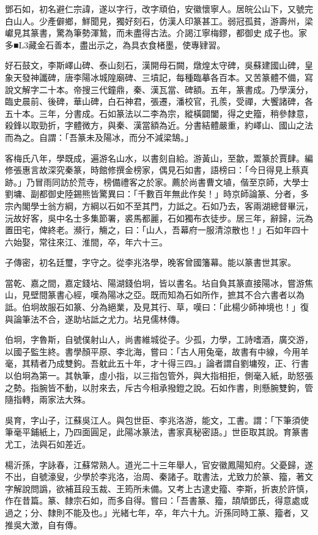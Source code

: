 \begin{pinyinscope}
鄧石如，初名避仁宗諱，遂以字行，改字頑伯，安徽懷寧人。居皖公山下，又號完白山人。少產僻鄉，鮮聞見，獨好刻石，仿漢人印篆甚工。弱冠孤貧，游壽州，梁巘見其篆書，驚為筆勢渾鷙，而未盡得古法。介謁江寧梅鏐，都御史成子也。家多■L3藏金石善本，盡出示之，為具衣食楮墨，使專肄習。

好石鼓文，李斯嶧山碑、泰山刻石，漢開母石闕，燉煌太守碑，吳蘇建國山碑，皇象天發神讖碑，唐李陽冰城隍廟碑、三墳記，每種臨摹各百本。又苦篆體不備，寫說文解字二十本。帝搜三代鐘鼎，秦、漢瓦當、碑額。五年，篆書成。乃學漢分，臨史晨前、後碑，華山碑，白石神君，張遷，潘校官，孔羨，受禪，大饗諸碑，各五十本。三年，分書成。石如篆法以二李為宗，縱橫闢闔，得之史籀，稍參隸意，殺鋒以取勁折，字體微方，與秦、漢當額為近。分書結體嚴重，約嶧山、國山之法而為之。自謂：「吾篆未及陽冰，而分不減梁鵠。」

客梅氏八年，學既成，遍游名山水，以書刻自給。游黃山，至歙，鬻篆於賈肆。編修張惠言故深究秦篆，時館修撰金榜家，偶見石如書，語榜曰：「今日得見上蔡真跡。」乃冒雨同訪於荒寺，榜備禮客之於家。薦於尚書曹文埴，偕至京師，大學士劉墉、副都御史陸錫熊皆驚異曰：「千數百年無此作矣！」時京師論篆、分者，多宗內閣學士翁方綱，方綱以石如不至其門，力詆之。石如乃去，客兩湖總督畢沅，沅故好客，吳中名士多集節署，裘馬都麗，石如獨布衣徒步。居三年，辭歸，沅為置田宅，俾終老。瀕行，觴之，曰：「山人，吾幕府一服清涼散也！」石如年四十六始娶，常往來江、淮間，卒，年六十三。

子傳密，初名廷璽，字守之。從李兆洛學，晚客曾國籓幕。能以篆書世其家。

當乾、嘉之間，嘉定錢坫、陽湖錢伯坰，皆以書名。坫自負其篆直接陽冰，嘗游焦山，見壁間篆書心經，嘆為陽冰之亞。既而知為石如所作，摭其不合六書者以為詆。伯坰故服石如篆、分為絕業，及見其行、草，嘆曰：「此楊少師神境也！」復與論筆法不合，遂助坫詆之尤力。坫見儒林傳。

伯坰，字魯斯，自號僕射山人，尚書維城從子。少孤，力學，工詩嗜酒，廣交游，以國子監生終。書學顏平原、李北海，嘗曰：「古人用兔毫，故書有中線，今用羊毫，其精者乃成雙鉤。吾躭此五十年，才十得三四。」論者謂自劉墉歿，正、行書以伯坰為第一。其執筆，虛小指，以三指包管外，與大指相拒，側毫入紙，助怒張之勢。指腕皆不動，以肘來去，斥古今相承撥鐙之說。石如作書，則懸腕雙鉤，管隨指轉，兩家法大殊。

吳育，字山子，江蘇吳江人。與包世臣、李兆洛游，能文，工書。謂：「下筆須使筆毫平鋪紙上，乃四面圓足，此陽冰篆法，書家真秘密語。」世臣取其說。育篆書尤工，法與石如差近。

楊沂孫，字詠春，江蘇常熟人。道光二十三年舉人，官安徽鳳陽知府。父憂歸，遂不出，自號濠叟，少學於李兆洛，治周、秦諸子。耽書法，尤致力於篆、籀，著文字解說問譌，欲補苴段玉裁、王筠所未備。又考上古逮史籀、李斯，折衷於許慎，作在昔篇。篆、隸宗石如，而多自得。嘗曰：「吾書篆、籀，頡頏鄧氏，得意處或過之；分、隸則不能及也。」光緒七年，卒，年六十九。沂孫同時工篆、籀者，又推吳大澂，自有傳。


\end{pinyinscope}
